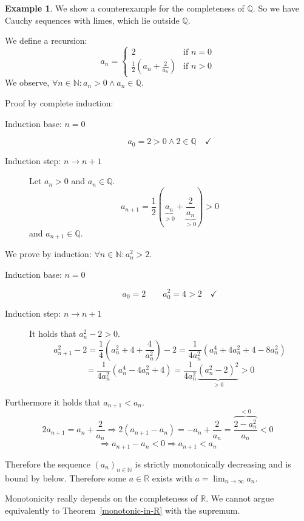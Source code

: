 \documentclass[a4paper,landscape,twocolumn]{article}
\theoremstyle{definition}
\newtheorem{ex}{Example}
\newcommand\seq[1]{{\left(#1\right)}_{n \in \mathbb N}}
\begin{document}
\begin{ex}
  We show a counterexample for the completeness of $\mathbb Q$.
  So we have Cauchy sequences with limes, which lie outside $\mathbb Q$.

  We define a recursion:
  \[
    a_n = \begin{cases}
      2 & \text{if } n = 0 \\
      \frac12 \left(a_n + \frac2{a_n}\right) & \text{if } n > 0
    \end{cases}
  \]
  We observe, $\forall n \in \mathbb N: a_n > 0 \land a_n \in \mathbb Q$.

  Proof by complete induction:
  \begin{description}
    \item[Induction base: $n = 0$]
      \[ a_0 = 2 > 0 \land 2 \in \mathbb Q \quad \checkmark \]
    \item[Induction step: $n \rightarrow n + 1$]
      Let $a_n > 0$ and $a_n \in \mathbb Q$.
      \[ a_{n+1} = \frac12 \left(\underbrace{a_n}_{>0} + \underbrace{\frac2{a_n}}_{>0}\right) > 0 \]
      and $a_{n+1} \in \mathbb Q$.
  \end{description}

  We prove by induction: $\forall n \in \mathbb N: a_n^2 > 2$.
  \begin{description}
    \item[Induction base: $n = 0$]
      \[ a_0 = 2 \qquad a_0^2 = 4 > 2 \quad \checkmark \]
    \item[Induction step: $n \rightarrow n+1$]
      It holds that $a_n^2 - 2 > 0$.
      \[
          a_{n+1}^2 - 2
          = \frac14 \left(a_n^2 + 4 + \frac4{a_n^2}\right) - 2
          = \frac{1}{4a_n^2} \left(a_n^4 + 4a_n^2 + 4 - 8a_n^2\right)
      \] \[
          = \frac{1}{4a_n^2} \left(a_n^4 - 4a_n^2 + 4\right)
          = \frac{1}{4a_n^2} \underbrace{\left(a_n^2 - 2\right)^2}_{>0} > 0
      \]
  \end{description}

  Furthermore it holds that $a_{n+1} < a_n$.
  \[ 2a_{n+1} = a_n + \frac2{a_n} \Rightarrow 2 (a_{n+1} - a_n) = -a_n + \frac2{a_n} = \frac{\overbrace{2 - a_n^2}^{<0}}{a_n} < 0 \]
  \[ \Rightarrow a_{n+1} - a_n < 0 \Rightarrow a_{n+1} < a_n \]

  Therefore the sequence $\seq{a_n}$ is strictly monotonically decreasing and is bound by below.
  Therefore some $a \in \mathbb R$ exists with $a = \lim_{n\to\infty} a_n$.

  Monotonicity really depends on the completeness of $\mathbb R$.
  We cannot argue equivalently to Theorem~\ref{monotonic-in-R} with the supremum.


\end{ex}
\end{document}

